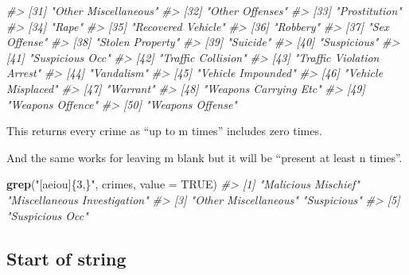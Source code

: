\documentclass[
  12pt,
]{book}
\newenvironment{Shaded}{\begin{snugshade}}{\end{snugshade}}
\newcommand{\CommentTok}[1]{\textcolor[rgb]{0.37,0.37,0.37}{\textit{#1}}}
\newcommand{\DataTypeTok}[1]{\textcolor[rgb]{0.27,0.27,0.27}{#1}}
\newcommand{\KeywordTok}[1]{\textcolor[rgb]{0.27,0.27,0.27}{\textbf{#1}}}
\newcommand{\NormalTok}[1]{#1}
\newcommand{\OtherTok}[1]{\textcolor[rgb]{0.37,0.37,0.37}{#1}}
\newcommand{\StringTok}[1]{\textcolor[rgb]{0.5,0.5,0.5}{#1}}
\begin{document}
\begin{Shaded}
\begin{Highlighting}[]
\CommentTok{\#\textgreater{} [31] "Other Miscellaneous"                       }
\CommentTok{\#\textgreater{} [32] "Other Offenses"                            }
\CommentTok{\#\textgreater{} [33] "Prostitution"                              }
\CommentTok{\#\textgreater{} [34] "Rape"                                      }
\CommentTok{\#\textgreater{} [35] "Recovered Vehicle"                         }
\CommentTok{\#\textgreater{} [36] "Robbery"                                   }
\CommentTok{\#\textgreater{} [37] "Sex Offense"                               }
\CommentTok{\#\textgreater{} [38] "Stolen Property"                           }
\CommentTok{\#\textgreater{} [39] "Suicide"                                   }
\CommentTok{\#\textgreater{} [40] "Suspicious"                                }
\CommentTok{\#\textgreater{} [41] "Suspicious Occ"                            }
\CommentTok{\#\textgreater{} [42] "Traffic Collision"                         }
\CommentTok{\#\textgreater{} [43] "Traffic Violation Arrest"                  }
\CommentTok{\#\textgreater{} [44] "Vandalism"                                 }
\CommentTok{\#\textgreater{} [45] "Vehicle Impounded"                         }
\CommentTok{\#\textgreater{} [46] "Vehicle Misplaced"                         }
\CommentTok{\#\textgreater{} [47] "Warrant"                                   }
\CommentTok{\#\textgreater{} [48] "Weapons Carrying Etc"                      }
\CommentTok{\#\textgreater{} [49] "Weapons Offence"                           }
\CommentTok{\#\textgreater{} [50] "Weapons Offense"}
\end{Highlighting}
\end{Shaded}

This returns every crime as ``up to m times'' includes zero times.

And the same works for leaving m blank but it will be ``present at least n times''.

\begin{Shaded}
\begin{Highlighting}[]
\KeywordTok{grep}\NormalTok{(}\StringTok{"[aeiou]\{3,\}"}\NormalTok{, crimes, }\DataTypeTok{value =} \OtherTok{TRUE}\NormalTok{)}
\CommentTok{\#\textgreater{} [1] "Malicious Mischief"          "Miscellaneous Investigation"}
\CommentTok{\#\textgreater{} [3] "Other Miscellaneous"         "Suspicious"                 }
\CommentTok{\#\textgreater{} [5] "Suspicious Occ"}
\end{Highlighting}
\end{Shaded}

\hypertarget{start-of-string}{%
\subsection{Start of string}\label{start-of-string}}
\end{document}
